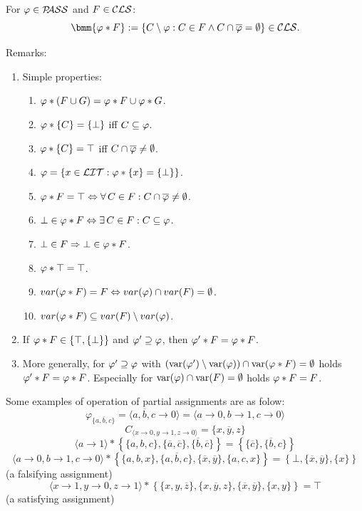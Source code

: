 \documentclass[]{book}
\begin{document}
\begin{defi}\label{def:oppassCls}
      For $\varphi \in \mathcal{P\hspace{-0.32em}ASS}$ and $F \in \mathcal{CLS}$:
      $$\bmm{\vp * F} := \set{C \sm \vp : C \in F \wedge C \cap \ol{\vp} = \es} \in \Cls.$$
\end{defi}
Remarks:
\begin{enumerate}
      \item Simple properties:
      \begin{enumerate}
            \item $\varphi * (F \cup G) = \varphi * F \cup \varphi * G$.
            \item $\varphi * \{ C \} = \{ \bot \}$ iff $C \subseteq \varphi$.
            \item $\varphi * \{ C \} = \top$ iff $C \cap \overline{\varphi} \ne \emptyset$.
            \item $\varphi = \{ x \in \mathcal{LIT} : \varphi * \{ x \} = \{ \bot \} \}$.
            \item $\varphi * F = \top \Leftrightarrow \forall\, C \in F : C \cap \overline{\varphi} \ne \emptyset$.
            \item $\bot \in \varphi * F \Leftrightarrow \exists\, C \in F : C \subseteq \varphi$.
            \item $\bot \in F \Rightarrow \bot \in \varphi * F$.
            \item $\varphi * \top = \top$.
            \item $ var(\varphi * F) = F \Leftrightarrow var(\varphi) \cap var(F) = \emptyset$.
            \item $ var(\varphi * F) \subseteq var(F) \setminus var(\varphi)$.
      \end{enumerate}
      \item If $\varphi * F \in \{ \top, \{ \bot \} \}$ and $\varphi' \supseteq \varphi$, then $\varphi' * F = \varphi * F$.
      \item More generally, for $\varphi' \supseteq \varphi$ with $(\operatorname{var}(\varphi') \setminus \operatorname{var}(\varphi)) \cap \operatorname{var}(\varphi * F) = \emptyset$ holds $\varphi' * F = \varphi * F$. 
	  Especially for $\operatorname{var}(\varphi) \cap \operatorname{var}(F) = \emptyset$ holds $\varphi * F = F$.
\end{enumerate}

\begin{examp}\label{exp:op1}
      Some examples of operation of partial assignments are as folow:
      $$\varphi_{\{a,\overline{b},c\}} = \langle a, \overline{b}, c\to 0\rangle = \langle a\to 0, b\to 1, c\to 0 \rangle $$
      $$C_{\langle x\to 0, y\to 1, z\to 0 \rangle} = \{x, \overline{y}, z\}$$
      $$\langle a\to 1 \rangle * \left\{\{a,b,c\}, \{\overline{a}, \overline{c}\}, \{\overline{b}, \overline{c}\} \right\} = \left\{\{\overline{c}\}, \{\overline{b}, c\} \right\}$$
      $$\langle a\to 0, b\to 1, c\to 0 \rangle * \left\{\{a,b,x\}, \{a,\overline{b},c\}, \{\overline{x}, \overline{y}\}, \{a,c,x\} \right\} = \left\{\bot, \{\overline{x}, \overline{y}\}, \{x\}\right\}$$
      (a falsifying assignment)
      $$\langle x\to 1, y\to 0, z\to 1 \rangle * \left\{\{x,y,\overline{z}\}, \{x,\overline{y},z\}, \{\overline{x}, \overline{y}\}, \{x,y\} \right\} = \top$$
      (a satisfying assignment)
\end{examp}
\end{document}

